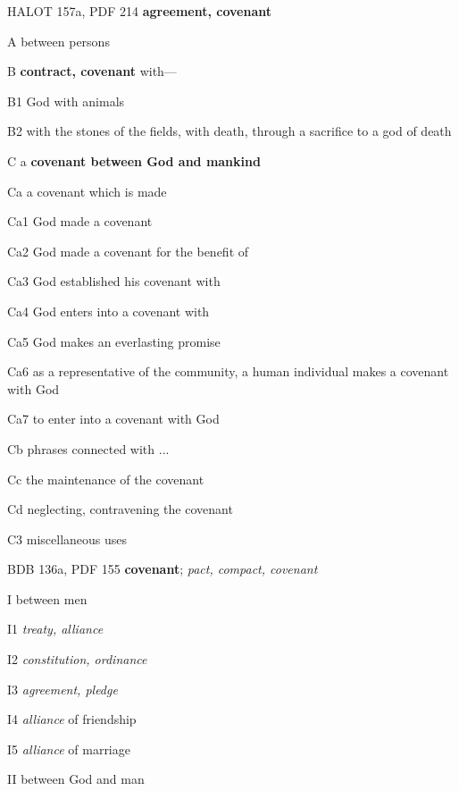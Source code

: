 				\begin{compactdesc}
					\item[HALOT 157a, PDF 214] \textbf{agreement, covenant}
						\begin{compactitem}
							\item[A] between persons
							\item[B] \textbf{contract, covenant} with---
							\item[B1] God with animals
							\item[B2] with the stones of the fields, with death, through a sacrifice to a god of death
							\item[C] a \textbf{covenant between God and mankind}
							\item[Ca] a covenant which is made
							\item[Ca1] God made a covenant
							\item[Ca2] God made a covenant for the benefit of
							\item[Ca3] God established his covenant with
							\item[Ca4] God enters into a covenant with
							\item[Ca5] God makes an everlasting promise
							\item[Ca6] as a representative of the community, a human individual makes a covenant with God
							\item[Ca7] to enter into a covenant with God
							\item[Cb] phrases connected with ...
							\item[Cc] the maintenance of the covenant
							\item[Cd] neglecting, contravening the covenant
							\item[C3] miscellaneous uses
						\end{compactitem}
					\item[BDB 136a, PDF 155] \textbf{covenant}; \textit{pact, compact, covenant}
						\begin{compactitem}
							\item[I] between men
							\item[I1] \textit{treaty, alliance}
							\item[I2] \textit{constitution, ordinance}
							\item[I3] \textit{agreement, pledge}
							\item[I4] \textit{alliance} of friendship
							\item[I5] \textit{alliance} of marriage
							\item[II] between God and man

\end{compactitem}
\end{compactdesc}
